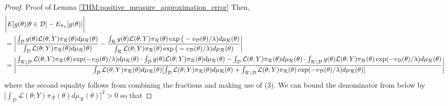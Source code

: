 \documentclass[10pt,fleqn]{article} \pdfoutput=1
\DeclareMathOperator{\1}{\mathbbm{1}} \DeclareMathOperator{\bigO}{\mc O}
\begin{document}
\begin{proof}{Proof of
		Lemma \ref{THM:positive_measure_approximation_error}}
	Then, \begin{align*}  & \bigg|
		E[g(\theta)|\theta\in\mathcal{D}]-E_{\tilde{\pi}_\lambda}[g(\theta)]\bigg|
		\\ &= \bigg|\frac{ \int_\mathcal{D} g(\theta)
			\mathcal{L}(\theta;Y)\pi_\mathcal{R}(\theta)d\mu_\mathcal{R}(\theta)}{\int_\mathcal{D}
			\mathcal{L}(\theta;Y)\pi_\mathcal{R}(\theta)d\mu_\mathcal{R}(\theta)}
		- \frac{\int_{\mathcal{R}} g(\theta)
			\mathcal{L}(\theta;Y)\pi_\mathcal{R}(\theta)\exp\big(-v_{\mathcal{D}}(\theta)/\lambda)d\mu_\mathcal{R}(\theta)}{\int_{\mathcal{R}}
			\mathcal{L}(\theta;Y)\pi_\mathcal{R}(\theta)\exp\big(-v_{\mathcal{D}}(\theta)/\lambda)d\mu_\mathcal{R}(\theta)}
		\bigg|    \\ & =
		\bigg|\frac{\int_{\mathcal{R}\setminus
				\mathcal{D}}
			\mathcal{L}(\theta;Y)\pi_\mathcal{R}(\theta)\exp(-v_{\mathcal{D}}(\theta)/\lambda
			) d\mu_\mathcal{R}(\theta) \cdot \int_\mathcal{D}g(\theta)
			\mathcal{L}(\theta;Y)\pi_\mathcal{R}(\theta)d\mu_\mathcal{R}(\theta)-\int_\mathcal{D}\mathcal{L}(\theta;Y)\pi_\mathcal{R}(\theta)d\mu_\mathcal{R}(\theta)
			\cdot \int_{\mathcal{R}\setminus \mathcal{D} } g(\theta)
			\mathcal{L}(\theta;Y)\pi_\mathcal{R}(\theta)\exp(-v_{\mathcal{D}}(\theta)/\lambda)
			d\mu_\mathcal{R}(\theta)}{\int_\mathcal{D}
			\mathcal{L}(\theta;Y)\pi_\mathcal{R}(\theta)d\mu_\mathcal{R}(\theta)[\int_\mathcal{D}
				\mathcal{L}(\theta;Y)\pi_\mathcal{R}(\theta)d\mu_\mathcal{R}(\theta) +
				\int_{\mathcal{R}\setminus\mathcal{D}}
				\mathcal{L}(\theta;Y)\pi_\mathcal{R}(\theta) \exp(-v_{\mathcal{D}}(\theta)/\lambda)
				d\mu_\mathcal{R}(\theta)] }  \bigg|\end{align*} where the second equality
	follows from combining the fractions and making use of (3). We can bound
	the denominator from below by  $ \big[\int_\mathcal{D}
			\mathcal{L}(\theta;Y)\pi_\mathcal{R}(\theta) d\mu_\mathcal{R}(\theta)
			\big]^2>0$ so that


\end{proof}
\end{document}
